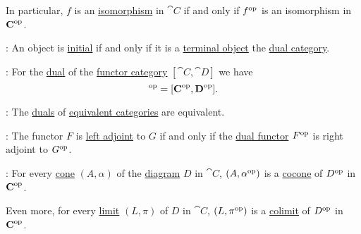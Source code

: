 \begin{proposition}
\begin{thmenum}
    In particular, \( f \) is an \hyperref[def:morphism_invertibility/isomorphism]{isomorphism} in \( \cat{C} \) if and only if \( f^{\operatorname{op}} \) is an isomorphism in \( \operatorname{\mathbf{C}}^{\operatorname{op}} \).

     : An object is \hyperref[def:universal_object/initial]{initial} if and only if it is a \hyperref[def:universal_object/terminal]{terminal object} the \hyperref[def:dual_category]{dual category}.

     : For the \hyperref[def:dual_category]{dual} of the \hyperref[def:functor_category]{functor category} \( [\cat{C}, \cat{D}] \) we have
    \begin{equation*}
      [\cat{C}, \cat{D}]^{\opcat} = [\cat{C}^{\opcat}, \cat{D}^{\opcat}].
    \end{equation*}

     : The \hyperref[def:dual_category]{duals} of \hyperref[def:category_equivalence]{equivalent categories} are equivalent.

     : The functor \( F \) is \hyperref[def:category_adjunction]{left adjoint} to \( G \) if and only if the \hyperref[def:dual_functor]{dual functor} \( F^{\operatorname{op}} \) is right adjoint to \( G^{\operatorname{op}} \).

     : For every \hyperref[def:category_of_cones/cone]{cone} \( (A, \alpha) \) of the \hyperref[def:categorical_diagram]{diagram} \( D \) in \( \cat{C} \), \( (A, \alpha^{\operatorname{op}}) \) is a \hyperref[def:category_of_cones/cone]{cocone} of \( D^{\operatorname{op}} \) in \( \operatorname{\mathbf{C}}^{\operatorname{op}} \).

    Even more, for every \hyperref[def:category_of_cones/limit]{limit} \( (L, \pi) \) of \( D \) in \( \cat{C} \), \( (L, \pi^{\operatorname{op}}) \) is a \hyperref[def:category_of_cones/colimit]{colimit} of \( D^{\operatorname{op}} \) in \( \operatorname{\mathbf{C}}^{\operatorname{op}} \).
  \end{thmenum}
\end{proposition}

